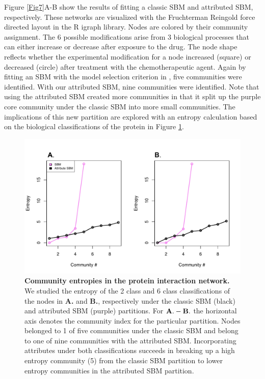 Figure \ref{Fig7}A-B show the results of fitting a classic SBM and attributed SBM, respectively. These networks are visualized with the Fruchterman Reingold force directed layout in the R igraph library. Nodes are colored by their community assignment. The 6 possible modifications arise from 3 biological processes that can either increase or decrease after exposure to the drug. The node shape reflects whether the experimental modification for a node increased (square) or decreased (circle) after treatment with the chemotherapeutic agent. Again by fitting an SBM with the model selection criterion in \cite{dudin}, five communities were identified. With our attributed SBM, nine communities were identified. Note that using the attributed SBM created more communities in that it split up the purple core community under the classic SBM into more small communities. The implications of this new partition are explored with an entropy calculation based on the biological classifications of the protein in Figure \ref{entropyFig}.
 \begin{figure}[h!]
\begin{center}
\includegraphics[width=.75\textwidth]{EntropyCalc_6Classleft_2classright.pdf}
\caption{{\bf Community entropies in the protein interaction network.} We studied the entropy of the 2 class and 6 class classifications of the nodes in {\bf A.} and {\bf B.}, respectively under the classic SBM (black) and attributed SBM (purple) partitions. For ${\bf A.-B.}$ the horizontal axis denotes the community index for the particular partition. Nodes belonged to 1 of five communities under the classic SBM and belong to one of nine communities with the attributed SBM. Incorporating attributes under both classifications succeeds in breaking up a high entropy community (5) from the classic SBM partition to lower entropy communities in the attributed SBM partition. }
\label{entropyFig} %
\end{center}
\end{figure}

